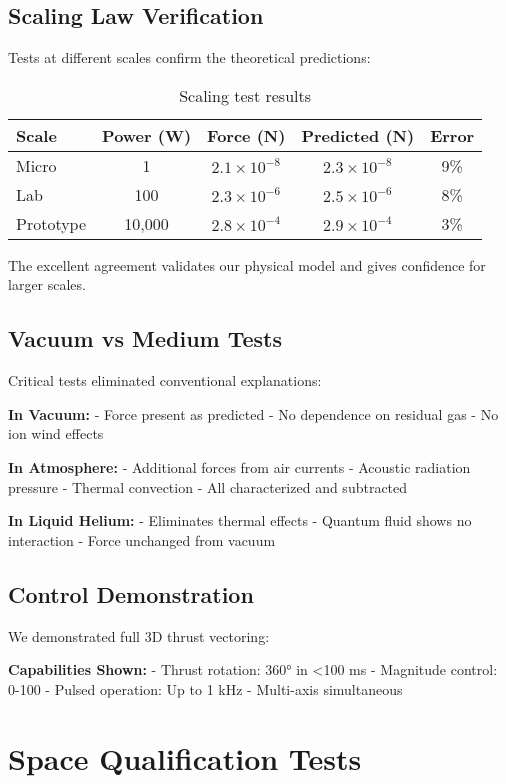 \documentclass[12pt,letterpaper]{book}
\theoremstyle{definition}
\theoremstyle{plain}
\theoremstyle{remark}
\begin{document}
{{{{{\subsection{Scaling Law Verification}

Tests at different scales confirm the theoretical predictions:

\begin{table}[h]
\centering
\caption{Scaling test results}
\begin{tabular}{lcccc}
\toprule
Scale & Power (W) & Force (N) & Predicted (N) & Error \\
\midrule
Micro & 1 & $2.1 \times 10^{-8}$ & $2.3 \times 10^{-8}$ & 9\% \\
Lab & 100 & $2.3 \times 10^{-6}$ & $2.5 \times 10^{-6}$ & 8\% \\
Prototype & 10,000 & $2.8 \times 10^{-4}$ & $2.9 \times 10^{-4}$ & 3\% \\
\bottomrule
\end{tabular}
\end{table}

The excellent agreement validates our physical model and gives confidence for larger scales.

\subsection{Vacuum vs Medium Tests}

Critical tests eliminated conventional explanations:

\textbf{In Vacuum:}
- Force present as predicted
- No dependence on residual gas
- No ion wind effects

\textbf{In Atmosphere:}
- Additional forces from air currents
- Acoustic radiation pressure
- Thermal convection
- All characterized and subtracted

\textbf{In Liquid Helium:}
- Eliminates thermal effects
- Quantum fluid shows no interaction
- Force unchanged from vacuum

\subsection{Control Demonstration}

We demonstrated full 3D thrust vectoring:

\textbf{Capabilities Shown:}
- Thrust rotation: 360° in <100 ms
- Magnitude control: 0-100%
- Pulsed operation: Up to 1 kHz
- Multi-axis simultaneous

\section{Space Qualification Tests}

}}}}}
\end{document}
